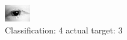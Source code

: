 \begin{figure}[h!]
\begin{center}
\includegraphics[width=0.60\columnwidth]{figures/ID99_class_4_target_3.png}
\end{center}
\caption{ Classification: 4 actual target: 3}
\label{fig:ID99_class_4_target_3}
\end{figure}
